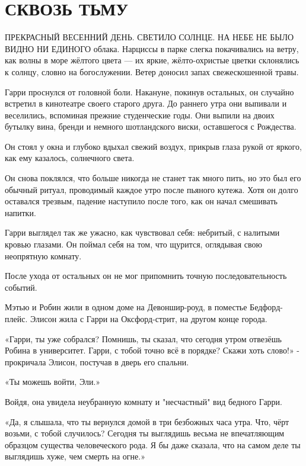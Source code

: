\documentclass[a4paper,12pt]{book}
\begin{document}
\chapter{СКВОЗЬ ТЬМУ}
\noindent{} ПРЕКРАСНЫЙ ВЕСЕННИЙ ДЕНЬ. СВЕТИЛО СОЛНЦЕ. НА НЕБЕ НЕ БЫЛО ВИДНО НИ ЕДИНОГО облака. Нарциссы в парке слегка покачивались на ветру, как волны в море жёлтого цвета — их яркие, жёлто-охристые цветки склонялись к солнцу, словно на богослужении. Ветер доносил запах свежескошенной травы.\\
\par
Гарри проснулся от головной боли. Накануне, покинув остальных, он случайно встретил в кинотеатре своего старого друга. До раннего утра они выпивали и веселились, вспоминая прежние студенческие годы. Они выпили на двоих бутылку вина, бренди и немного шотландского виски, оставшегося с Рождества.
\par
Он стоял у окна и глубоко вдыхал свежий воздух, прикрыв глаза рукой от яркого, как ему казалось, солнечного света.
\par
Он снова поклялся, что больше никогда не станет так много пить, но это был его обычный ритуал, проводимый каждое утро после пьяного кутежа. Хотя он долго оставался трезвым, падение наступило после того, как он начал смешивать напитки.
\par
Гарри выглядел так же ужасно, как чувствовал себя: небритый, с налитыми кровью глазами. Он поймал себя на том, что щурится, оглядывая свою неопрятную комнату.
\par
После ухода от остальных он не мог припомнить точную последовательность событий.
\par
Мэтью и Робин жили в одном доме на Девоншир-роуд, в поместье Бедфорд-плейс. Элисон жила с Гарри на Оксфорд-стрит, на другом конце города.\\
\par
«Гарри, ты уже собрался? Помнишь, ты сказал, что сегодня утром отвезёшь Робина в университет. Гарри, с тобой точно всё в порядке? Скажи хоть слово!» - прокричала Элисон, постучав в дверь его спальни.
\par
«Ты можешь войти, Эли.»
\par
Войдя, она увидела неубранную комнату и "несчастный" вид бедного Гарри.
\par
«Да, я слышала, что ты вернулся домой в три безбожных часа утра. Что, чёрт возьми, с тобой случилось? Сегодня ты выглядишь весьма не впечатляющим образцом существа человеческого рода. Я бы даже сказала, что на самом деле ты выглядишь хуже, чем смерть на огне.»
\par
\end{document}

